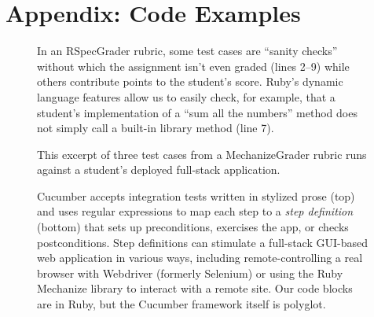 
\clearpage
\section*{Appendix: Code Examples}

\begin{figure} \centering
  
  \caption{\label{fig:rspec_grader_rubric} In an RSpecGrader rubric,
    some test cases are ``sanity checks'' without which the assignment
    isn't even graded (lines 2--9) while others contribute points to the
    student's score.
  Ruby's dynamic language features allow us to
    easily check, for example, that
a student's implementation of a ``sum all the numbers'' method does not
simply call a built-in library method (line 7).
  }
\end{figure}


\begin{figure}
 \centering
  
  \caption{\label{fig:mechanize_grader_example} 
This excerpt of three test cases from a MechanizeGrader rubric runs
against a student's 
deployed full-stack application.}
\end{figure}

\begin{figure}
  \centering
    
  \caption{\label{fig:cucumber} Cucumber accepts integration tests 
    written in stylized prose (top) and uses regular expressions to map each
    step to a \emph{step definition} (bottom) that sets up preconditions, exercises the app,
    or checks postconditions.  Step definitions 
    can stimulate a full-stack GUI-based web application in various
    ways, including remote-controlling a real browser with Webdriver
    (formerly Selenium) or using the Ruby Mechanize library to interact
    with a remote site.  Our code blocks are in Ruby, but the Cucumber framework
itself is polyglot.} 
\end{figure}

 
